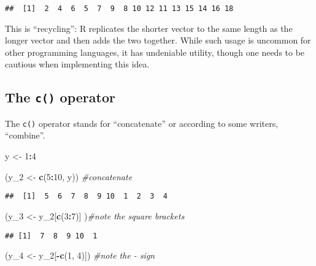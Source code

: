 \documentclass[11pt,]{article}
\newenvironment{Shaded}{\begin{snugshade}}{\end{snugshade}}
\newcommand{\KeywordTok}[1]{\textcolor[rgb]{0.13,0.29,0.53}{\textbf{#1}}}
\newcommand{\DecValTok}[1]{\textcolor[rgb]{0.00,0.00,0.81}{#1}}
\newcommand{\StringTok}[1]{\textcolor[rgb]{0.31,0.60,0.02}{#1}}
\newcommand{\CommentTok}[1]{\textcolor[rgb]{0.56,0.35,0.01}{\textit{#1}}}
\newcommand{\OperatorTok}[1]{\textcolor[rgb]{0.81,0.36,0.00}{\textbf{#1}}}
\newcommand{\NormalTok}[1]{#1}
\begin{document}
\begin{verbatim}
##  [1]  2  4  6  5  7  9  8 10 12 11 13 15 14 16 18
\end{verbatim}

This is ``recycling'': R replicates the shorter vector to the same
length as the longer vector and then adds the two together. While such
usage is uncommon for other programming languages, it has undeniable
utility, though one needs to be cautious when implementing this idea.

\subsection{\texorpdfstring{The \texttt{c()}
operator}{The c() operator}}\label{the-c-operator}

The \texttt{c()} operator stands for ``concatenate'' or according to
some writers, ``combine''.

\begin{Shaded}
\begin{Highlighting}[]
\NormalTok{y <-}\StringTok{ }\DecValTok{1}\OperatorTok{:}\DecValTok{4}

\NormalTok{(y_}\DecValTok{2}\NormalTok{ <-}\StringTok{ }\KeywordTok{c}\NormalTok{(}\DecValTok{5}\OperatorTok{:}\DecValTok{10}\NormalTok{, y)) }\CommentTok{#concatenate}
\end{Highlighting}
\end{Shaded}

\begin{verbatim}
##  [1]  5  6  7  8  9 10  1  2  3  4
\end{verbatim}

\begin{Shaded}
\begin{Highlighting}[]
\NormalTok{(y_}\DecValTok{3}\NormalTok{ <-}\StringTok{ }\NormalTok{y_}\DecValTok{2}\NormalTok{[}\KeywordTok{c}\NormalTok{(}\DecValTok{3}\OperatorTok{:}\DecValTok{7}\NormalTok{)] )}\CommentTok{#note the square brackets}
\end{Highlighting}
\end{Shaded}

\begin{verbatim}
## [1]  7  8  9 10  1
\end{verbatim}

\begin{Shaded}
\begin{Highlighting}[]
\NormalTok{(y_}\DecValTok{4}\NormalTok{ <-}\StringTok{ }\NormalTok{y_}\DecValTok{2}\NormalTok{[}\OperatorTok{-}\KeywordTok{c}\NormalTok{(}\DecValTok{1}\NormalTok{, }\DecValTok{4}\NormalTok{)]) }\CommentTok{#note the - sign}
\end{Highlighting}
\end{Shaded}
\end{document}
